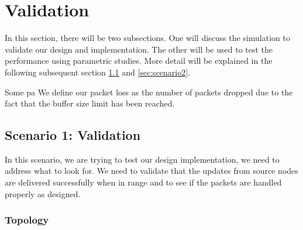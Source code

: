 %

\section{Validation} %

In this section, there will be two subsections.  One will discuss the simulation to validate our design and implementation.  
The other will be used to test the performance using parametric studies.  
More detail will be explained in the following subsequent section \ref{sec:scenario1} and \ref{sec:scenario2}.

Some pa
We define our packet loss as the number of packets dropped due to the fact that the buffer size limit has been reached.



\subsection{Scenario 1: Validation}
\label{sec:scenario1}

In this scenario, we are trying to test our design implementation, we need to address what to look for.  
We need to validate that the updates from source nodes are delivered successfully when in range and to see if the packets are handled properly as designed.  

\subsubsection{Topology}

